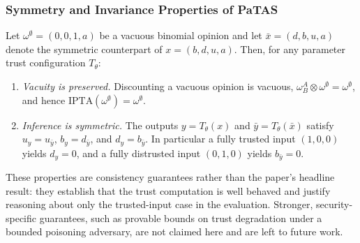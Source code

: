 \subsubsection{Symmetry and Invariance Properties of PaTAS}\label{sec:ptassyminv}

\begin{theorem}\label{thm:infvac}
Let \(\omega^\emptyset=(0,0,1,a)\) be a vacuous binomial opinion and let \(\bar{x}=(d,b,u,a)\) denote the symmetric counterpart of \(x=(b,d,u,a)\). Then, for any parameter trust configuration \(T_\theta\):
\begin{enumerate}
    \item \emph{Vacuity is preserved.} Discounting a vacuous opinion is vacuous, \(\omega^A_B \otimes \omega^\emptyset = \omega^\emptyset\), and hence \(\mathrm{IPTA}(\omega^\emptyset) = \omega^\emptyset\).
    \item \emph{Inference is symmetric.} The outputs \(y = T_\theta(x)\) and \(\bar y = T_\theta(\bar x)\) satisfy \(u_y = u_{\bar y}\), \(b_y = d_{\bar y}\), and \(d_y = b_{\bar y}\). In particular a fully trusted input \((1,0,0)\) yields \(d_y = 0\), and a fully distrusted input \((0,1,0)\) yields \(b_{\bar y} = 0\).
\end{enumerate}
\end{theorem}

These properties are consistency guarantees rather than the paper's headline result: they establish that the trust computation is well behaved and justify reasoning about only the trusted-input case in the evaluation. Stronger, security-specific guarantees, such as provable bounds on trust degradation under a bounded poisoning adversary, are not claimed here and are left to future work.
